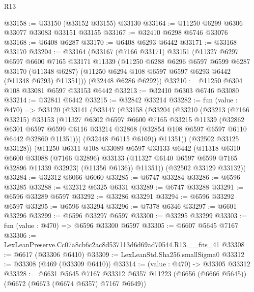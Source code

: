 \begin{lexlean}{R13}
\begin{coremodule}
@33158 := @33150 (@33152 @33155) @33130
@33164 := @11250 @6299 @6306 @33077 @33083 @33151 @33155
@33167 := @32410 @6298 @6746 @33076
@33168 := @6408 @6287
@33170 := @6408 @6293 @6442
@33171 := @33168 @33170
@33204 := @33164
    (@33167
      (@7166 @33171)
      @33151
      (@11327
        @6297
        @6597
        @6600
        @7165
        @33171
        @11339
        (@11250
          @6288
          @6296
          @6597
          @6599
          @6287
          @33170
          (@11348 @6287)
          (@11250 @6294 @108 @6597 @6597 @6293 @6442 (@11348 @6293) @11351)))
      (@32448 @6286 @6292))
@33210 := @11250 @6304 @108 @33081 @6597 @33153 @6442
@33213 := @32410 @6303 @6746 @33080
@33214 := @32841 @6442
@33215 := @32842 @33214
@33282 := fun (value : @470) =>
  @33120
    (@33141
      (@33147
        (@33158
          (@33204
            (@33210
              (@33213
                (@7166 @33215)
                @33153
                (@11327
                  @6302
                  @6597
                  @6600
                  @7165
                  @33215
                  @11339
                  (@32862
                    @6301
                    @6597
                    @6599
                    @6116
                    @33214
                    @32868
                    (@32854 @108 @6597 @6597 @6110 @6442 @32860 @11351)))
                (@32448 @6115 @6109))
              @11351))
          (@32502 @33125 @33128))
        (@11250
          @6311
          @108
          @33089
          @6597
          @33133
          @6442
          (@11318
            @6310
            @6600
            @33088
            (@7166 @32896)
            @33133
            (@11327 @6140 @6597 @6599 @7165 @32896 @11339 @32923)
            (@11356 @6136))
          @11351))
      (@32502 @33129 @33132))
@33284 := @32312 @6066 @6060
@33285 := @6747 @33284
@33286 := @6596 @33285
@33288 := @32312 @6325 @6331
@33289 := @6747 @33288
@33291 := @6596 @33289 @6597
@33292 := @33286 @33291
@33294 := @6596 @33292 @6597
@33295 := @6596 @33294
@33296 := @7378 @6346
@33297 := @6601 @33296
@33299 := @6596 @33297 @6597
@33300 := @33295 @33299
@33303 := fun (value : @470) => @6596 @33300 @6597
@33305 := @6607 @5645 @7167
@33306 := LexLeanPreserve.Cc07a8cb6c2ac8d537113d6d69ad70544.R13.__fits_41
@33308 := @6617 (@33306 @6410)
@33309 := LexLeanStd.Sha256.smallSigma0
@33312 := @33308 (@469 (@33309 @6410))
@33314 := (value : @470) -> @33305 @33312
@33328 := @6631
    @5645
    @7167
    @33312
    @6357
    @11223
    (@6656 (@6666 @5645))
    (@6672 (@6673 (@6674 @6357) @7167 @6649))

\end{coremodule}
\end{lexlean}
